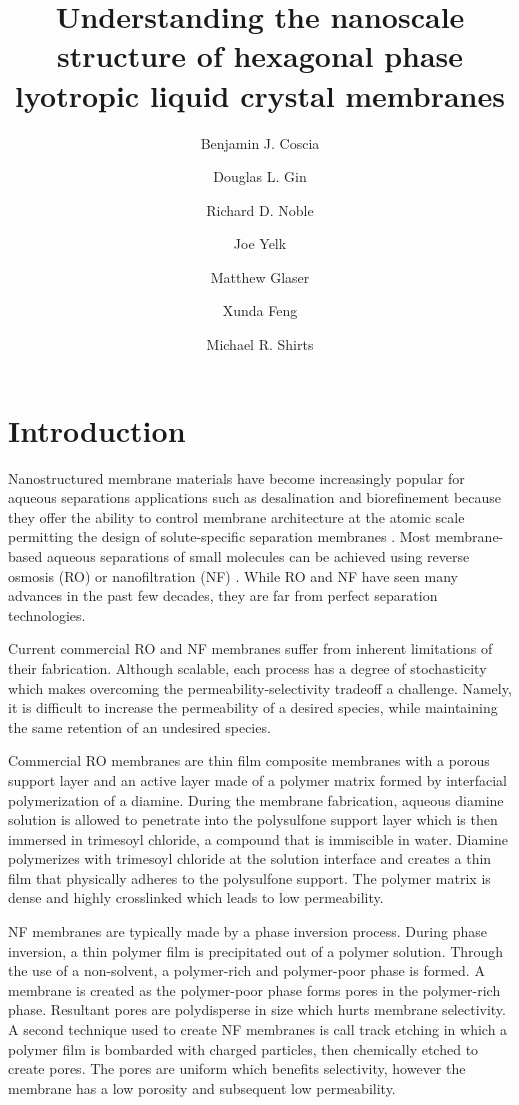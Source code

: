 \documentclass{article}
\title{Understanding the nanoscale structure of hexagonal phase
lyotropic liquid crystal membranes}
\author{Benjamin J. Coscia \and Douglas L. Gin \and Richard D. Noble
\and Joe Yelk \and Matthew Glaser \and Xunda Feng \and Michael R.
Shirts}
\begin{document}
  
  \graphicspath{{./figures/}}
  \maketitle

  \section{Introduction}
  
  Nanostructured membrane materials have become increasingly popular for
  aqueous separations applications such as desalination and biorefinement because
  they offer the ability to control membrane architecture at the atomic scale
  permitting the design of solute-specific separation membranes
  \cite{humplik_nanostructured_2011}. Most membrane-based aqueous separations of
  small molecules can be achieved using reverse osmosis (RO) or nanofiltration
  (NF) \cite{van_der_bruggen_review_2003}. While RO and NF have seen many
  advances in the past few decades, they are far from perfect separation
  technologies. 

  Current commercial RO and NF membranes suffer from inherent limitations of
  their fabrication. Although scalable, each process has a degree of
  stochasticity which makes overcoming the permeability-selectivity tradeoff a
  challenge. Namely, it is difficult to increase the permeability of a desired
  species, while maintaining the same retention of an undesired species. 

  Commercial RO membranes are thin film composite membranes with a porous
  support layer and an active layer made of a polymer matrix formed by
  interfacial polymerization of a diamine. During the membrane fabrication,
  aqueous diamine solution is allowed to penetrate into the polysulfone support
  layer which is then immersed in trimesoyl chloride, a compound that is
  immiscible in water. Diamine polymerizes with trimesoyl chloride at the
  solution interface and creates a thin film that physically adheres to the
  polysulfone support. The polymer matrix is dense and highly crosslinked
  which leads to low permeability. 
  
  NF membranes are typically made by a phase inversion process. During phase
  inversion, a thin polymer film is precipitated out of a polymer solution.
  Through the use of a non-solvent, a polymer-rich and polymer-poor phase is
  formed. A membrane is created as the polymer-poor phase forms pores in the
  polymer-rich phase. Resultant pores are polydisperse in size which hurts
  membrane selectivity. A second technique used to create NF membranes is call
  track etching in which a polymer film is bombarded with charged particles, then
  chemically etched to create pores. The pores are uniform which benefits
  selectivity, however the membrane has a low porosity and subsequent low
  permeability. 
 
\end{document}
